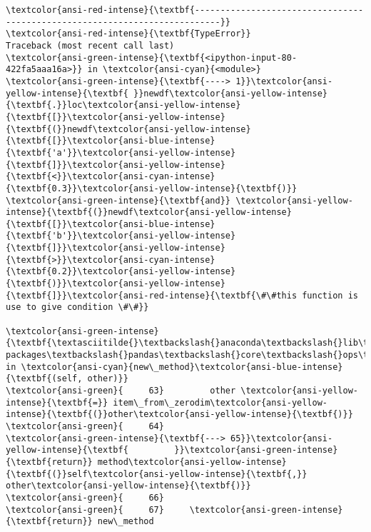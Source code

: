 \documentclass[11pt]{article}
\begin{document}
    \begin{Verbatim}[commandchars=\\\{\}, frame=single, framerule=2mm, rulecolor=\color{outerrorbackground}]
\textcolor{ansi-red-intense}{\textbf{---------------------------------------------------------------------------}}
\textcolor{ansi-red-intense}{\textbf{TypeError}}                                 Traceback (most recent call last)
\textcolor{ansi-green-intense}{\textbf{<ipython-input-80-422fa5aaa16a>}} in \textcolor{ansi-cyan}{<module>}
\textcolor{ansi-green-intense}{\textbf{----> 1}}\textcolor{ansi-yellow-intense}{\textbf{ }}newdf\textcolor{ansi-yellow-intense}{\textbf{.}}loc\textcolor{ansi-yellow-intense}{\textbf{[}}\textcolor{ansi-yellow-intense}{\textbf{(}}newdf\textcolor{ansi-yellow-intense}{\textbf{[}}\textcolor{ansi-blue-intense}{\textbf{'a'}}\textcolor{ansi-yellow-intense}{\textbf{]}}\textcolor{ansi-yellow-intense}{\textbf{<}}\textcolor{ansi-cyan-intense}{\textbf{0.3}}\textcolor{ansi-yellow-intense}{\textbf{)}} \textcolor{ansi-green-intense}{\textbf{and}} \textcolor{ansi-yellow-intense}{\textbf{(}}newdf\textcolor{ansi-yellow-intense}{\textbf{[}}\textcolor{ansi-blue-intense}{\textbf{'b'}}\textcolor{ansi-yellow-intense}{\textbf{]}}\textcolor{ansi-yellow-intense}{\textbf{>}}\textcolor{ansi-cyan-intense}{\textbf{0.2}}\textcolor{ansi-yellow-intense}{\textbf{)}}\textcolor{ansi-yellow-intense}{\textbf{]}}\textcolor{ansi-red-intense}{\textbf{\#\#this function is use to give condition \#\#}}

\textcolor{ansi-green-intense}{\textbf{\textasciitilde{}\textbackslash{}anaconda\textbackslash{}lib\textbackslash{}site-packages\textbackslash{}pandas\textbackslash{}core\textbackslash{}ops\textbackslash{}common.py}} in \textcolor{ansi-cyan}{new\_method}\textcolor{ansi-blue-intense}{\textbf{(self, other)}}
\textcolor{ansi-green}{     63}         other \textcolor{ansi-yellow-intense}{\textbf{=}} item\_from\_zerodim\textcolor{ansi-yellow-intense}{\textbf{(}}other\textcolor{ansi-yellow-intense}{\textbf{)}}
\textcolor{ansi-green}{     64} 
\textcolor{ansi-green-intense}{\textbf{---> 65}}\textcolor{ansi-yellow-intense}{\textbf{         }}\textcolor{ansi-green-intense}{\textbf{return}} method\textcolor{ansi-yellow-intense}{\textbf{(}}self\textcolor{ansi-yellow-intense}{\textbf{,}} other\textcolor{ansi-yellow-intense}{\textbf{)}}
\textcolor{ansi-green}{     66} 
\textcolor{ansi-green}{     67}     \textcolor{ansi-green-intense}{\textbf{return}} new\_method


\end{Verbatim}
\end{document}
